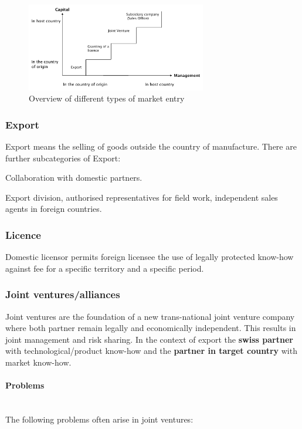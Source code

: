 \begin{figure}[H]
	\centering
	\includegraphics[width=0.7\textwidth]{figures/typesMarketEntry.png}
	\caption{Overview of different types of market entry}
\end{figure}

\subsubsection{Export}
Export means the selling of goods outside the country of manufacture. There are further subcategories of Export:

\begin{description}
	\tightlist
	\item[Indirect export] Collaboration with domestic partners.
	\item[Direct export] Export division, authorised representatives for field work, independent sales agents in foreign countries.
\end{description}

\subsubsection{Licence}
Domestic licensor permits foreign licensee the use of legally protected know-how against fee for a specific territory and a specific period.

\subsubsection{Joint ventures/alliances}
Joint ventures are the foundation of a new trans-national joint venture company where both partner remain legally and economically independent. This results in joint management and risk sharing. In the context of export the \textbf{swiss partner} with \mbox{technological/product} know-how and the \textbf{partner in target country} with market know-how.

\paragraph{Problems} \mbox{}\\
The following problems often arise in joint ventures:

